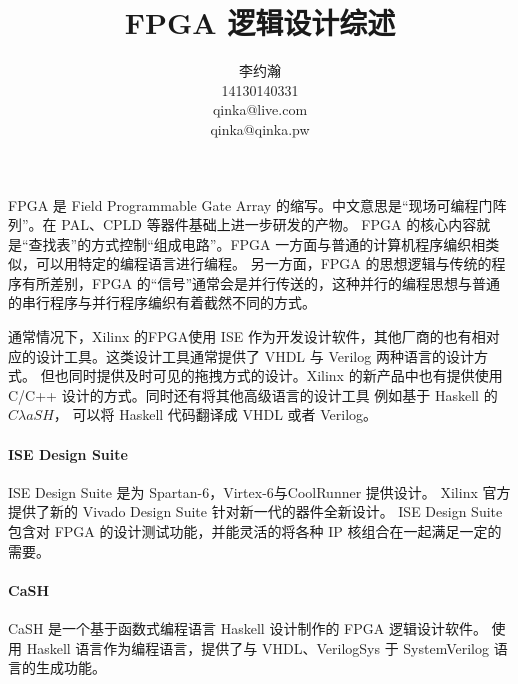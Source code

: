 \documentclass{ctexart}
\title{FPGA 逻辑设计综述}
\author{李约瀚 \\ 14130140331 \\ qinka@live.com \\ qinka@qinka.pw}
\begin{document}
\maketitle


FPGA 是 Field Programmable Gate Array 的缩写。中文意思是“现场可编程门阵列”。在 PAL、CPLD 等器件基础上进一步研发的产物。
FPGA 的核心内容就是“查找表”的方式控制“组成电路”。FPGA 一方面与普通的计算机程序编织相类似，可以用特定的编程语言进行编程。
另一方面，FPGA 的思想逻辑与传统的程序有所差别，FPGA 的“信号”通常会是并行传送的，这种并行的编程思想与普通的串行程序与并行程序编织有着截然不同的方式。

通常情况下，Xilinx 的FPGA使用 ISE 作为开发设计软件，其他厂商的也有相对应的设计工具。这类设计工具通常提供了 VHDL 与 Verilog 两种语言的设计方式。
但也同时提供及时可见的拖拽方式的设计。Xilinx 的新产品中也有提供使用 C/C++ 设计的方式。同时还有将其他高级语言的设计工具 例如基于 Haskell 的 $C\lambda aSH$，
可以将 Haskell 代码翻译成 VHDL 或者 Verilog。

\paragraph{ISE Design Suite}

ISE Design Suite 是为 Spartan-6，Virtex-6与CoolRunner 提供设计。 Xilinx 官方提供了新的 Vivado Design Suite 针对新一代的器件全新设计。
ISE Design Suite 包含对 FPGA 的设计测试功能，并能灵活的将各种 IP 核组合在一起满足一定的需要。

\paragraph{C\lambda aSH}
C\lambda aSH 是一个基于函数式编程语言 Haskell 设计制作的 FPGA 逻辑设计软件。
使用 Haskell 语言作为编程语言，提供了与 VHDL、VerilogSys 于 SystemVerilog 语言的生成功能。
\end{document}
